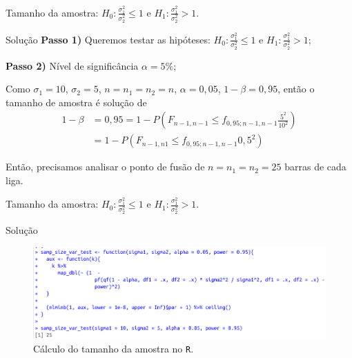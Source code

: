 \documentclass[9pt]{beamer}
\begin{document}
\begin{frame}{Tamanho da amostra: $H_0:\frac{\sigma_1^2}{\sigma_2^2} \leq 1$ e $H_1:\frac{\sigma_1^2}{\sigma_2^2} > 1$.}

\begin{block}{Solução}
	\textbf{Passo 1)} Queremos testar as hipóteses: $H_0: \frac{\sigma_1^2}{\sigma_2^2} \leq 1$ e $H_1: \frac{\sigma_1^2}{\sigma_2^2} > 1$;
	
	\textbf{Passo 2)} Nível de significância $\alpha=5\%$;
	
	Como $\sigma_1=10$, $\sigma_2=5$, $n=n_1=n_2=n$, $\alpha=0,05$, $1-\beta = 0,95$, então o tamanho de amostra é solução de
	\begin{align*}
	1-\beta &= 0,95 = 1- P \left( F_{n-1, n-1} \leq f_{0,95; n-1, n-1} \frac{5^2}{10^2} \right)\\ 
	&= 1- P \left( F_{n-1, n1} \leq f_{0,95; n-1, n-1} 0,5^2 \right)
	\end{align*}
	
	Então, precisamos analisar o ponto de fusão de $n=n_1=n_2=25$  barras de cada liga.
\end{block}
\end{frame}

\begin{frame}{Tamanho da amostra: $H_0:\frac{\sigma_1^2}{\sigma_2^2} \leq 1$ e $H_1:\frac{\sigma_1^2}{\sigma_2^2} > 1$.}

\normalsize

\begin{block}{Solução}
	\begin{figure}[htbp]
		\centering
		\includegraphics[width=\linewidth]{figures/samp-size-test-var-h1-upper}
		\caption{Cálculo do tamanho da amostra no \texttt{R}.}
	\end{figure}
	
\end{block}
\end{frame}
\end{document}
